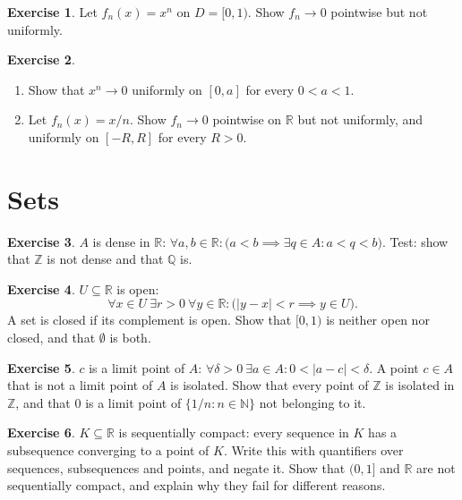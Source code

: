 \documentclass{workbook}
\theoremstyle{definition}
\newtheorem{exercise}{Exercise}[section]
\newcommand{\N}{\mathbb{N}}
\newcommand{\Z}{\mathbb{Z}}
\newcommand{\Q}{\mathbb{Q}}
\newcommand{\R}{\mathbb{R}}
\begin{document}
\begin{exercise}\label{ex:xn}
Let $f_n(x) = x^n$ on $D = [0,1)$. Show $f_n \to 0$ pointwise but not uniformly.
\end{exercise}

\begin{exercise}\label{ex:unifdomain}
\begin{enumerate}
  \item Show that $x^n \to 0$ uniformly on $[0, a]$ for every $0 < a < 1$.
  \item Let $f_n(x) = x/n$. Show $f_n \to 0$ pointwise on $\R$ but not uniformly, and uniformly on $[-R, R]$ for every $R > 0$.
\end{enumerate}
\end{exercise}

\section{Sets}

\begin{exercise}\label{ex:dense}
$A$ is dense in $\R$: $\forall a, b \in \R : \bigl(a < b \implies \exists q \in A : a < q < b\bigr)$. Test: show that $\Z$ is not dense and that $\Q$ is.
\end{exercise}

\begin{exercise}\label{ex:open}
$U \subseteq \R$ is open:
\[
  \forall x \in U\ \exists r > 0\ \forall y \in \R : \bigl(|y - x| < r \implies y \in U\bigr).
\]
A set is closed if its complement is open. Show that $[0,1)$ is neither open nor closed, and that $\emptyset$ is both.
\end{exercise}

\begin{exercise}\label{ex:limpt}
$c$ is a limit point of $A$: $\forall \delta > 0\ \exists a \in A : 0 < |a - c| < \delta$. A point $c \in A$ that is not a limit point of $A$ is isolated. Show that every point of $\Z$ is isolated in $\Z$, and that $0$ is a limit point of $\{1/n : n \in \N\}$ not belonging to it.
\end{exercise}

\begin{exercise}\label{ex:seqcpt}
$K \subseteq \R$ is sequentially compact: every sequence in $K$ has a subsequence converging to a point of $K$. Write this with quantifiers over sequences, subsequences and points, and negate it. Show that $(0,1]$ and $\R$ are not sequentially compact, and explain why they fail for different reasons.
\end{exercise}
\end{document}
